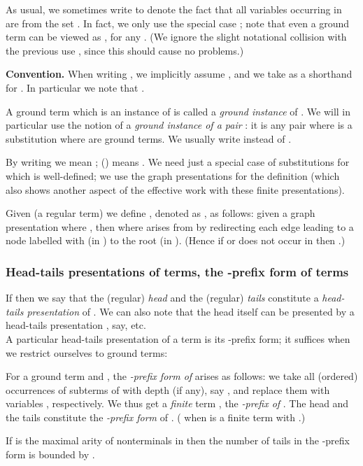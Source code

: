 \documentclass[12pt]{article}
\begin{document}
As usual, we sometimes write 
to denote the fact
that all variables occurring in   
are from the set
.
In fact, we only use the special case ;
note that even a ground term  
can be viewed
as , for any .
(We ignore the slight notational collision with 
the previous use , since this should cause no problems.)

\smallskip
\noindent
\textbf{Convention.} When writing , we implicitly
assume , and we take 
  as a
shorthand for . In particular
we note that .

\smallskip

\noindent
A ground term  which is an instance of  is called
a \emph{ground instance} of .
We will in particular use the notion
of a \emph{ground instance of a pair} 
: it is any 
pair 
where  is a substitution  
where  are ground terms.
We usually write  instead of 
 .



By writing  we mean ;  
() means .
We need just a  special case of substitutions
 for which  
is well-defined; we use the graph presentations for the definition
(which also shows another aspect of the effective work with these
finite presentations).

\begin{defn}
Given (a regular term)  we define , denoted as
, as follows: given a graph presentation  where
, then  where  arises from 
by redirecting each edge leading to a node labelled
with  (in ) to the root (in ).
(Hence if  or 
does not occur in  then 
.)
\end{defn}





\subsubsection*{Head-tails presentations of terms,
the -prefix form of terms}

If  then we say that 
the (regular) \emph{head}  and the (regular)
\emph{tails}   constitute a 
\emph{head-tails presentation} of . 
We can also note that
the head  itself can be presented by a head-tails
presentation , say, etc. 
\\
A particular head-tails presentation of a term is its 
-prefix form; it suffices when we restrict ourselves to ground terms:

\begin{defn}\label{def:dprefix}
For a ground term  and , the
\emph{-prefix
form of}  arises as follows:
we take all (ordered) occurrences of subterms of  with depth  (if
any), say , 
and replace them with variables ,
respectively. We thus get a \emph{finite} term
, 
the \emph{-prefix of}
. 
The head  and the tails  constitute the
\emph{-prefix form} of . 
( when  is a finite term with .)
\end{defn}
\begin{observ}\label{prop:boundtails}
If  is the maximal arity of nonterminals in 
then the number  of tails in the
-prefix form is bounded by .
\end{observ}
\end{document}

